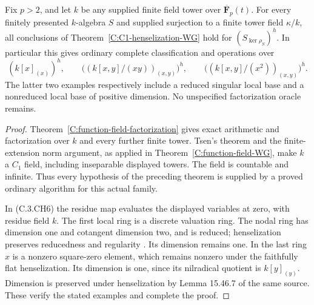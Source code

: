 \begin{corollary}
\label{C:function-field-henselization-WG}
Fix $p>2$, and let $k$ be any supplied finite
field tower over $\overline{\mathbf F}_p(t)$.
For every finitely presented $k$-algebra $S$
and supplied surjection to a finite tower
field $\kappa/k$, all conclusions of
Theorem~\ref{C:C1-henselization-WG} hold
for $(S_{\ker\rho_S})^h$.
In particular this gives ordinary complete
classification and operations over
\[
 (k[x]_{(x)})^h,\qquad
 \bigl((k[x,y]/(xy))_{(x,y)}\bigr)^h,
 \qquad
 \bigl((k[x,y]/(x^2))_{(x,y)}\bigr)^h.                   \tag{C.3.CH6}
\]
The latter two examples respectively include
a reduced singular local base and a
nonreduced local base of positive dimension.
No unspecified factorization oracle remains.
\end{corollary}
\begin{proof}
Theorem~\ref{C:function-field-factorization}
gives exact arithmetic and factorization
over $k$ and every further finite tower.
Tsen's theorem and the finite-extension
norm argument, as applied in
Theorem~\ref{C:function-field-WG},
make $k$ a $C_1$ field, including
inseparable displayed towers.
The field is countable and infinite.
Thus every hypothesis of the preceding
theorem is supplied by a proved ordinary
algorithm for this actual family.

In (C.3.CH6) the residue map evaluates
the displayed variables at zero, with
residue field $k$.
The first local ring is a discrete
valuation ring.  The nodal ring has
dimension one and cotangent dimension
two, and is reduced; henselization
preserves reducedness and regularity
\cite[Lemmas 15.46.4 and 15.46.10,
Tag 07QL]{C-StacksHenselianEffective}.
Its dimension remains one.
In the last ring $x$ is a nonzero
square-zero element, which remains
nonzero under the faithfully flat
henselization.  Its dimension is
one, since its nilradical quotient
is $k[y]_{(y)}$.
Dimension is preserved under
henselization by Lemma 15.46.7
of the same source.
These verify the stated examples
and complete the proof.
\end{proof}
